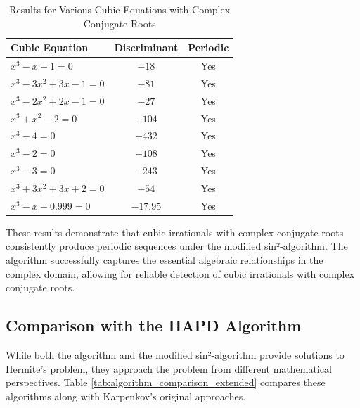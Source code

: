 \begin{table}[h]
\centering
\caption{Results for Various Cubic Equations with Complex Conjugate Roots}
\label{tab:period_lengths}
\begin{tabular}{|l|c|c|}
\hline
\textbf{Cubic Equation} & \textbf{Discriminant} & \textbf{Periodic} \\
\hline
$x^3 - x - 1 = 0$ & $-18$ & Yes \\
$x^3 - 3x^2 + 3x - 1 = 0$ & $-81$ & Yes \\
$x^3 - 2x^2 + 2x - 1 = 0$ & $-27$ & Yes \\
$x^3 + x^2 - 2 = 0$ & $-104$ & Yes \\
$x^3 - 4 = 0$ & $-432$ & Yes \\
$x^3 - 2 = 0$ & $-108$ & Yes \\
$x^3 - 3 = 0$ & $-243$ & Yes \\
$x^3 + 3x^2 + 3x + 2 = 0$ & $-54$ & Yes \\
$x^3 - x - 0.999 = 0$ & $-17.95$ & Yes \\
\hline
\end{tabular}
\end{table}

These results demonstrate that cubic irrationals with complex conjugate roots consistently produce periodic sequences under the modified sin²-algorithm. The algorithm successfully captures the essential algebraic relationships in the complex domain, allowing for reliable detection of cubic irrationals with complex conjugate roots.

\subsection{Comparison with the HAPD Algorithm}

While both the \HAPD{} algorithm and the modified sin²-algorithm provide solutions to Hermite's problem, they approach the problem from different mathematical perspectives. Table \ref{tab:algorithm_comparison_extended} compares these algorithms along with Karpenkov's original approaches.

